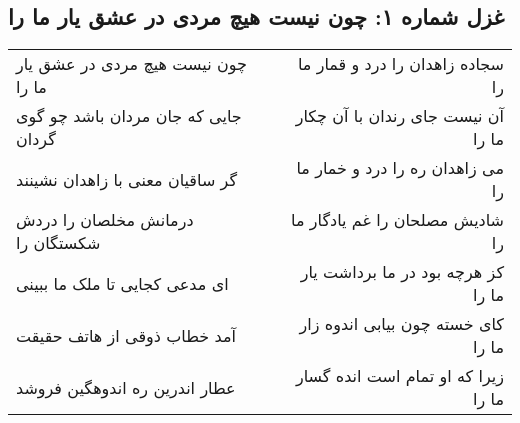 \begin{center}
\section*{غزل شماره ۱: چون نیست هیچ مردی در عشق یار ما را}
\label{sec:001}
\begin{longtable}{l p{0.5cm} r}
چون نیست هیچ مردی در عشق یار ما را
&&
سجاده زاهدان را درد و قمار ما را
\\
جایی که جان مردان باشد چو گوی گردان
&&
آن نیست جای رندان با آن چکار ما را
\\
گر ساقیان معنی با زاهدان نشینند
&&
می زاهدان ره را درد و خمار ما را
\\
درمانش مخلصان را دردش شکستگان را
&&
شادیش مصلحان را غم یادگار ما را
\\
ای مدعی کجایی تا ملک ما ببینی
&&
کز هرچه بود در ما برداشت یار ما را
\\
آمد خطاب ذوقی از هاتف حقیقت
&&
کای خسته چون بیابی اندوه زار ما را
\\
عطار اندرین ره اندوهگین فروشد
&&
زیرا که او تمام است انده گسار ما را
\\
\end{longtable}
\end{center}

